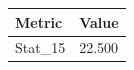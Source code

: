 \begin{tabular}{ll}
\toprule
Metric & Value \\
\midrule
Stat\_15 & 22.500 \\
\bottomrule
\end{tabular}